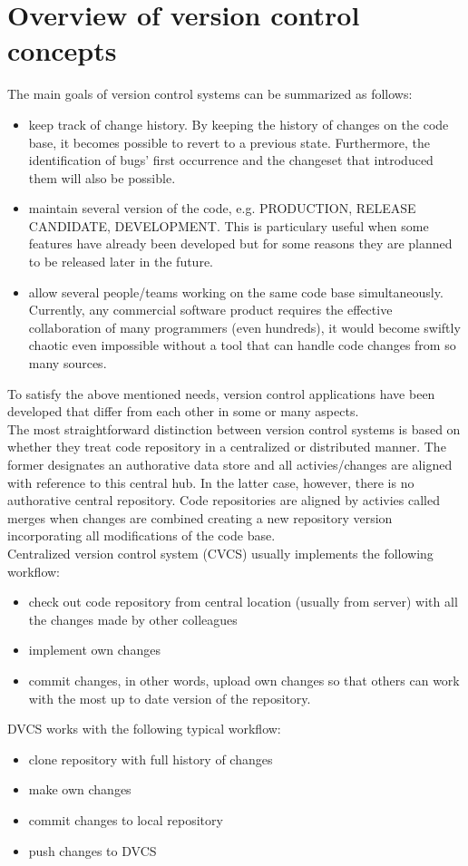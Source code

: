\section{Overview of version control concepts} \label{overview-version-control}
The main goals of version control systems can be summarized as follows:
\begin{itemize}
    \item keep track of change history. By keeping the history of changes on the code base, it becomes possible to revert
    to a previous state. Furthermore, the identification of bugs' first occurrence and the changeset that introduced them
    will also be possible.
    \item maintain several version of the code, e.g. PRODUCTION, RELEASE CANDIDATE, DEVELOPMENT. This is particulary
    useful when some features have already been developed but for some reasons they are planned to be released later in 
    the future.
    \item allow several people/teams working on the same code base simultaneously. Currently, any commercial software
    product requires the effective collaboration of many programmers (even hundreds), it would become swiftly chaotic
    even impossible without a tool that can handle code changes from so many sources.
\end{itemize}
To satisfy the above mentioned needs, version control applications have been developed that differ from each other in
some or many aspects. \\
The most straightforward distinction between version control systems is based on whether they treat code repository in 
a centralized or distributed manner. The former designates an authorative data store and all activies/changes are 
aligned with reference to this central hub. In the latter case, however, there is no authorative central repository.
Code repositories are aligned by activies called merges when changes are combined creating a new repository version 
incorporating all modifications of the code base. \\
Centralized version control system (CVCS) usually implements the following workflow:
\begin{itemize}
    \item check out code repository from central location (usually from server) with all the changes made by other
    colleagues
    \item implement own changes
    \item commit changes, in other words, upload own changes so that others can work with the most up to date version of
    the repository.
\end{itemize}
DVCS works with the following typical workflow:
\begin{itemize}
    \item clone repository with full history of changes
    \item make own changes
    \item commit changes to local repository
    \item push changes to DVCS
\end{itemize}
